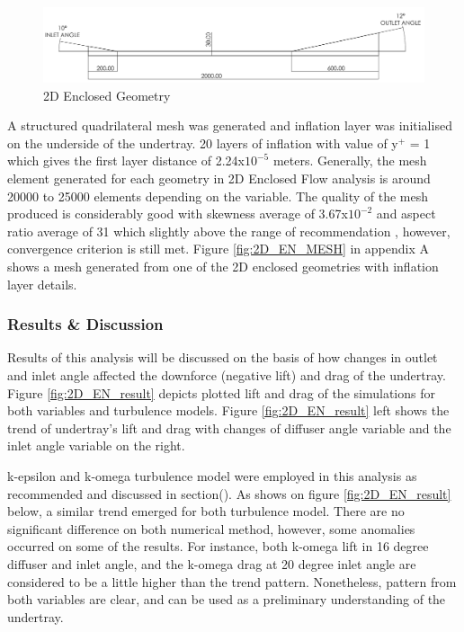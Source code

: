 \begin{figure}[!ht]
    \centering
    \includegraphics[scale=0.18]{Figures/2D_EN/2D_EN_D.PNG}
    \caption{2D Enclosed Geometry}
    \label{fig:2D_EN_Geom}
\end{figure}
  
\noindent A structured quadrilateral mesh was generated and inflation layer was initialised on the underside of the undertray. 20 layers of inflation with value of y$^+$ = 1 which gives the first layer distance of 2.24x$10^{-5}$ meters. Generally, the mesh element generated for each geometry in 2D Enclosed Flow analysis is around 20000 to 25000 elements depending on the variable. The quality of the mesh produced is considerably good with skewness average of 3.67x$10^{-2}$ and aspect ratio average of 31 which slightly above the range of recommendation \cite{Lanfrit2005BestFLUENT}, however, convergence criterion is still met. Figure \ref{fig:2D_EN_MESH} in appendix A shows a mesh generated from one of the 2D enclosed geometries with inflation layer details.

\subsubsection{Results \& Discussion}
Results of this analysis will be discussed on the basis of how changes in outlet and inlet angle affected the downforce (negative lift) and drag of the undertray. Figure \ref{fig:2D_EN_result} depicts plotted lift and drag of the simulations for both variables and turbulence models. Figure \ref{fig:2D_EN_result} left shows the trend of undertray's lift and drag with changes of diffuser angle variable and the inlet angle variable on the right. 

\noindent k-epsilon and k-omega turbulence model were employed in this analysis as recommended\cite{} and discussed in section(). As shows on figure \ref{fig:2D_EN_result} below, a similar trend emerged for both turbulence model. There are no significant difference on both numerical method, however,  some anomalies occurred on some of the results. For instance, both k-omega lift in 16 degree diffuser and inlet angle, and the k-omega drag at 20 degree inlet angle are considered to be a little higher than the trend pattern. Nonetheless, pattern from both variables are clear, and can be used as a preliminary understanding of the undertray.

